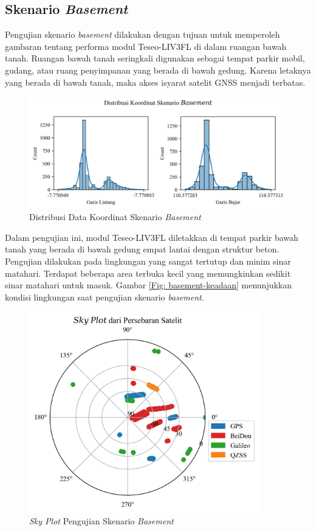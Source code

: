 \subsection{Skenario \textit{Basement}}
Pengujian skenario \textit{basement} dilakukan dengan tujuan untuk memperoleh gambaran tentang performa modul Teseo\hyp{}LIV3FL di dalam ruangan bawah tanah. Ruangan bawah tanah seringkali digunakan sebagai tempat parkir mobil, gudang, atau ruang penyimpanan yang berada di bawah gedung. Karena letaknya yang berada di bawah tanah, maka akses isyarat satelit GNSS menjadi terbatas.

\begin{figure}[H]
	\centering
	\begin{adjustbox}{width=\textwidth}
		\includegraphics{contents/chapter-4/1-skenario-basement/distribution.png}
	\end{adjustbox}
	\caption{Distribusi Data Koordinat Skenario \textit{Basement}}
	\label{Fig:basement-distribution}
\end{figure}

Dalam pengujian ini, modul Teseo\hyp{}LIV3FL diletakkan di tempat parkir bawah tanah yang berada di bawah gedung empat lantai dengan struktur beton. Pengujian dilakukan pada lingkungan yang sangat tertutup dan minim sinar matahari. Terdapat beberapa area terbuka kecil yang memungkinkan sedikit sinar matahari untuk masuk. Gambar \ref{Fig: basement-keadaan} menunjukkan kondisi lingkungan saat pengujian skenario \textit{basement}.

\begin{figure}[H]
	\centering
	\includegraphics[width=10cm]{contents/chapter-4/1-skenario-basement/sky_plot.png}
	\caption{\textit{Sky Plot} Pengujian Skenario \textit{Basement}}
	\label{Fig: basement-skyplot}
\end{figure}

